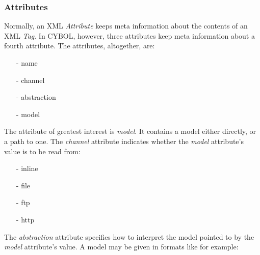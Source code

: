 %
%
%
%
%
%
%

\subsubsection{Attributes}
\label{attributes_heading}

Normally, an XML \emph{Attribute} keeps meta information about the contents of
an XML \emph{Tag}. In CYBOL, however, three attributes keep meta information
about a fourth attribute. The attributes, altogether, are:

\begin{itemize}
    \item[-] name
    \item[-] channel
    \item[-] abstraction
    \item[-] model
\end{itemize}

The attribute of greatest interest is \emph{model}. It contains a model either
directly, or a path to one. The \emph{channel} attribute indicates whether the
\emph{model} attribute's value is to be read from:

\begin{itemize}
    \item[-] inline
    \item[-] file
    \item[-] ftp
    \item[-] http
\end{itemize}

The \emph{abstraction} attribute specifies how to interpret the model pointed
to by the \emph{model} attribute's value. A model may be given in formats like
for example:

